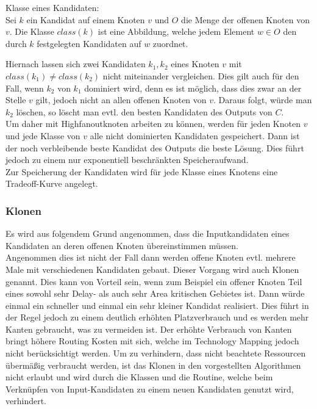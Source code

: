 \documentclass[11pt, a4paper, german]{article}
\newcommand{\TM}{Technology  Mapping }
\begin{document}
\begin{definition}{Klasse eines Kandidaten:}\\
	Sei $k$ ein Kandidat auf einem Knoten $v$ und $O$ die Menge der offenen Knoten von $v$. Die Klasse $class(k)$ ist eine Abbildung, welche jedem Element $w \in O$ den durch $k$ festgelegten Kandidaten auf $w$ zuordnet.
\end{definition}
Hiernach lassen sich zwei Kandidaten $k_1,k_2$ eines Knoten $v$ mit $class(k_1) \neq class(k_2)$ nicht miteinander vergleichen. Dies gilt auch für den Fall, wenn $k_2$ von  $k_1$ dominiert wird, denn es ist möglich, dass dies zwar an der Stelle $v$ gilt, jedoch nicht an allen offenen Knoten von $v$. Daraus folgt, würde man $k_2$ löschen, so löscht man evtl. den besten Kandidaten des Outputs von $C$. \\
Um daher mit Highfanoutknoten arbeiten zu können, werden für jeden Knoten $v$ und jede Klasse von $v$ alle nicht dominierten Kandidaten gespeichert. Dann ist der noch verbleibende beste Kandidat des Outputs die beste Lösung. Dies führt jedoch zu einem nur exponentiell beschränkten Speicheraufwand.\\
Zur Speicherung der Kandidaten wird für jede Klasse eines Knotens eine Tradeoff-Kurve angelegt.

\subsubsection{Klonen}

Es wird aus folgendem Grund angenommen, dass die Inputkandidaten eines Kandidaten an deren offenen Knoten übereinstimmen müssen.\\
Angenommen dies ist nicht der Fall dann werden offene Knoten evtl. mehrere Male mit verschiedenen Kandidaten gebaut. Dieser Vorgang wird auch Klonen genannt. Dies kann von Vorteil sein, wenn zum Beispiel ein offener Knoten Teil eines sowohl sehr Delay- als auch sehr Area kritischen Gebietes ist. Dann würde einmal ein schneller und einmal ein sehr kleiner Kandidat realisiert. Dies führt in der Regel jedoch zu einem deutlich erhöhten Platzverbrauch und es werden mehr Kanten gebraucht, was zu vermeiden ist. Der erhöhte Verbrauch von Kanten bringt höhere Routing Kosten mit sich, welche im \TM jedoch nicht berücksichtigt werden. Um zu verhindern, dass nicht beachtete Ressourcen übermäßig verbraucht werden, ist das Klonen in den vorgestellten Algorithmen nicht erlaubt und wird durch die Klassen und die Routine, welche beim Verknüpfen von Input-Kandidaten zu einem neuen Kandidaten genutzt wird, verhindert. 
\end{document}
